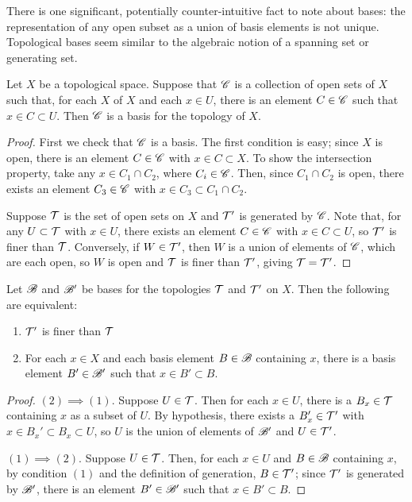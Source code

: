 \documentclass[10pt]{report}
\begin{document}
  There is one significant, potentially counter-intuitive fact to note about bases:
  the representation of any open subset as a union of basis elements is not unique.
  Topological bases seem similar to the algebraic notion of a spanning set or generating set.

  \begin{lemma}
    Let $X$ be a topological space.
    Suppose that $\mathscr{C}$ is a collection of open sets of $X$ such that, for each $X$ of $X$ and each $x \in U$, there is an element $C \in \mathscr{C}$ such that $x \in C \subset U$.
    Then $\mathscr{C}$ is a basis for the topology of $X$.
  \end{lemma}
  \begin{proof}
    First we check that $\mathscr{C}$ is a basis.
    The first condition is easy; since $X$ is open, there is an element $C \in \mathscr{C}$ with $x \in C \subset X$.
    To show the intersection property, take any $x \in C_1 \cap C_2$, where $C_i \in \mathscr{C}$.
    Then, since $C_1 \cap C_2$ is open, there exists an element $C_3 \in \mathscr{C}$ with $x \in C_3 \subset C_1 \cap C_2$.

    Suppose $\mathcal{T}$ is the set of open sets on $X$ and $\mathcal{T}'$ is generated by $\mathscr{C}$.
    Note that, for any $U \subset \mathcal{T}$ with $x \in U$, there exists an element $C \in \mathscr{C}$ with $x \in C \subset U$, so $\mathcal{T}'$ is finer than $\mathcal{T}$.
    Conversely, if $W \in \mathcal{T}'$, then $W$ is a union of elements of $\mathscr{C}$, which are each open, so $W$ is open and $\mathcal{T}$ is finer than $\mathcal{T}'$, giving $\mathcal{T} = \mathcal{T}'$.
  \end{proof}

  \begin{lemma}
    Let $\mathscr{B}$ and $\mathscr{B}'$ be bases for the topologies $\mathcal{T}$ and $\mathcal{T}'$ on $X$.
    Then the following are equivalent:
    \begin{enumerate}[label={(\arabic*)}]
      \item $\mathcal{T}'$ is finer than $\mathcal{T}$
      \item For each $x \in X$ and each basis element $B \in \mathscr{B}$ containing $x$, there is a basis element $B' \in \mathscr{B}'$ such that $x \in B' \subset B$.
    \end{enumerate}
  \end{lemma}
  \begin{proof}
    $(2) \implies (1)$. Suppose $U \in \mathcal{T}$.
    Then for each $x \in U$, there is a $B_x \in \mathcal{T}$ containing $x$ as a subset of $U$.
    By hypothesis, there exists a $B_x' \in \mathcal{T}'$ with $x \in B_x' \subset B_x \subset U$, so $U$ is the union of elements of $\mathscr{B}'$ and $U \in \mathcal{T}'$.

    $(1) \implies (2)$. Suppose $U \in \mathcal{T}$.
    Then, for each $x \in U$ and $B \in \mathscr{B}$ containing $x$, by condition $(1)$ and the definition of generation, $B \in \mathcal{T}'$; since $\mathcal{T}'$ is generated by $\mathscr{B}'$, there is an element $B' \in \mathscr{B}'$ such that $x \in B' \subset B$.
  \end{proof}
  
\end{document}
